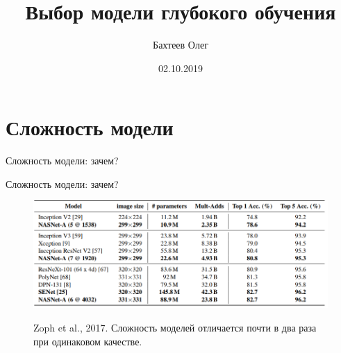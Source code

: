\documentclass[usenames,dvipsnames,10pt,pdf,utf8,russian,aspectratio=43]{beamer}
\title[Выбор модели]{Выбор модели глубокого обучения}
\author{Бахтеев Олег}
\institute{МФТИ}
\date{02.10.2019}
\begin{document}
\begin{frame}
  \titlepage
\end{frame}


\section{Сложность модели}
\begin{frame}{Сложность модели: зачем?}
\begin{figure}
  \centering
\label{fig:1}\qquad

\end{figure}


\end{frame}

\begin{frame}{Сложность модели: зачем?}

\begin{figure}
  \centering
 {\includegraphics[width=\textwidth]{zoph.png}}
\label{fig:1}\qquad
\caption*{Zoph et al., 2017.  Сложность моделей отличается почти в два раза при одинаковом качестве.}
\end{figure}
\end{frame}
\end{document}
